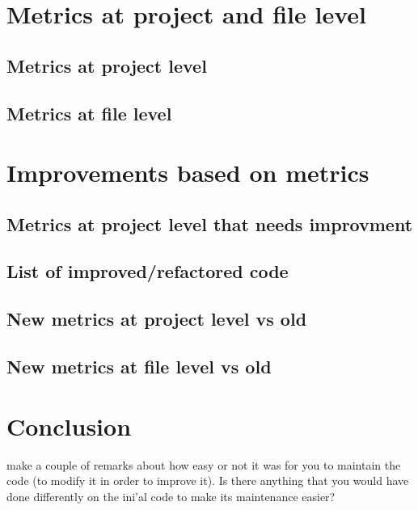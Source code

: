 \documentclass{article}
\begin{document}
\section{Metrics at project and file level}

\subsection{Metrics at project level}

\subsection{Metrics at file level}

\section{Improvements based on metrics}

\subsection{Metrics at project level that needs improvment}

\subsection{List of improved/refactored code}

\subsection{New metrics at project level vs old}

\subsection{New metrics at file level vs old}

\section{Conclusion}
make a couple of remarks about how easy or not it was for you to maintain the code
(to modify it in order to improve it). Is there anything that you would have done differently on
the ini'al code to make its maintenance easier?
\end{document}
